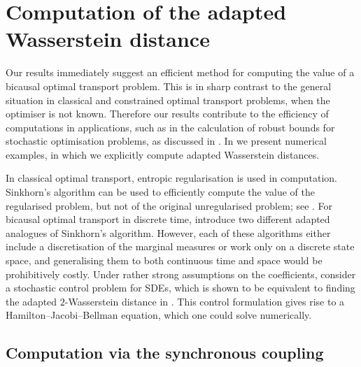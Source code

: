 \documentclass[onseside, final]{amsart}
\theoremstyle{definition}
\numberwithin{equation}{section}
\begin{document}
\section{Computation of the adapted Wasserstein distance}\label{sec:numerics}
	
	Our results immediately suggest an efficient method for computing the value of a bicausal optimal transport problem. This is in sharp contrast to the general situation in classical and constrained optimal transport problems, when the optimiser is not known. Therefore our results contribute to the efficiency of computations in applications, such as in the calculation of robust bounds for stochastic optimisation problems, as discussed in . In  we present numerical examples, in which we explicitly compute adapted Wasserstein distances.
	
		In classical optimal transport, entropic regularisation is used in computation. Sinkhorn's algorithm can be used to efficiently compute the value of the regularised problem, but not of the original unregularised problem; see \citet{Cu13,PeCu19}. 
		For bicausal optimal transport in discrete time, \citet{PiWe21,EcPa22} introduce two different adapted analogues of Sinkhorn's algorithm. However, each of these algorithms either include a discretisation of the marginal measures or work only on a discrete state space, and generalising them to both continuous time and space would be prohibitively costly. 
	Under rather strong assumptions on the coefficients, \citet{BiTa19} consider a stochastic control problem for SDEs, which is shown to be equivalent to finding the adapted $2$-Wasserstein distance in \citep[Proposition 2.2]{BaKaRo22}. This control formulation gives rise to a Hamilton--Jacobi--Bellman equation, which one could solve numerically.
	
	\subsection{Computation via the synchronous coupling}\label{sec:computation-sync}
	
\end{document}
